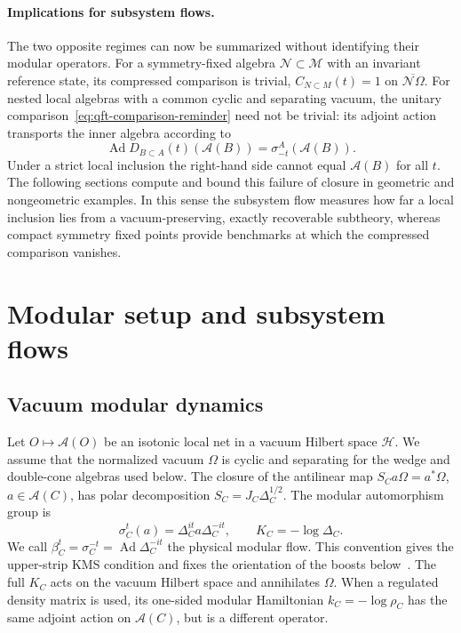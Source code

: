 \documentclass[a4paper,11pt]{article}
\theoremstyle{definition}
\begin{document}
\paragraph{Implications for subsystem flows.} 
The two opposite regimes can now be summarized without identifying
their modular operators. For a symmetry-fixed algebra
$\mathcal N\subset\mathcal M$ with an invariant reference state, its
compressed comparison is trivial,
$C_{N\subset M}(t)=1$ on $\overline{\mathcal N\Omega}$.
For nested local algebras with a common cyclic and separating vacuum,
the unitary comparison~\eqref{eq:qft-comparison-reminder} need not be
trivial: its adjoint action transports the inner algebra according to
\begin{equation}
 \operatorname{Ad}D_{B\subset A}(t)(\mathcal A(B))
   =\sigma_{-t}^{A}(\mathcal A(B)).
 \label{eq:qft-subsystem-transport}
\end{equation}
Under a strict local inclusion the right-hand side cannot equal
$\mathcal A(B)$ for all $t$. The following sections compute and bound
this failure of closure in geometric and nongeometric examples. In this
sense the subsystem flow measures how far a local inclusion lies from
a vacuum-preserving, exactly recoverable subtheory, whereas compact
symmetry fixed points provide benchmarks at which the compressed
comparison vanishes.

\section{Modular setup and subsystem flows}\label{sec:setup}

\subsection{Vacuum modular dynamics}

Let $O\mapsto\mathcal A(O)$ be an isotonic local net in a vacuum Hilbert space $\mathcal H$. We assume that the normalized vacuum $\Omega$ is cyclic and separating for the wedge and double-cone algebras used below. The closure of the antilinear map $S_Ca\Omega=a^*\Omega$, $a\in\mathcal A(C)$, has polar decomposition $S_C=J_C\Delta_C^{1/2}$. The modular automorphism group is
\begin{equation}
 \sigma_C^t(a)=\Delta_C^{it}a\Delta_C^{-it},\qquad K_C=-\log\Delta_C.
 \label{eq:modular-flow}
\end{equation}
We call $\beta_C^t=\sigma_C^{-t}=\operatorname{Ad}\Delta_C^{-it}$ the physical modular flow. This convention gives the upper-strip KMS condition and fixes the orientation of the boosts below~\cite{revolutionizing,companion}. The full $K_C$ acts on the vacuum Hilbert space and annihilates $\Omega$. When a regulated density matrix is used, its one-sided modular Hamiltonian $k_C=-\log\rho_C$ has the same adjoint action on $\mathcal A(C)$, but is a different operator.
\end{document}
